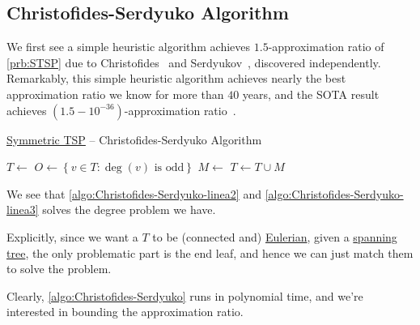 \subsection{Christofides-Serdyuko Algorithm}
We first see a simple heuristic algorithm achieves \(1.5\)-approximation ratio of \autoref{prb:STSP} due to Christofides~\cite{Christofides2022WorstCaseAO} and Serdyukov~\cite{Anatoliy}, discovered independently. Remarkably, this simple heuristic algorithm achieves nearly the best approximation ratio we know for more than \(40\) years, and the SOTA result achieves \((1.5-10^{-36})\)-approximation ratio~\cite{10.1145/3406325.3451009}.

\begin{algorithm}[H]\label{algo:Christofides-Serdyuko}
	\DontPrintSemicolon
	\caption{\hyperref[prb:STSP]{Symmetric TSP} -- Christofides-Serdyuko Algorithm~\cite{Christofides2022WorstCaseAO,Anatoliy}}
	\BlankLine
	\(T \gets\)\label{algo:Christofides-Serdyuko-linea1}
	\(O\gets \left\{ v\in T \colon \deg(v)\text{ is odd}\right\} \)\label{algo:Christofides-Serdyuko-linea2}\;
	\(M\gets\)\label{algo:Christofides-Serdyuko-linea3}
	\(T\gets T \cup M\)\;
	\;
\end{algorithm}

\begin{remark}
	We see that \autoref{algo:Christofides-Serdyuko-linea2} and \autoref{algo:Christofides-Serdyuko-linea3} solves the degree problem we have.
\end{remark}
\begin{explanation}
	Explicitly, since we want a \(T\) to be (connected and) \href{https://en.wikipedia.org/wiki/Eulerian_path}{Eulerian}, given a \hyperref[def:spanning-tree]{spanning tree}, the only problematic part is the end leaf, and hence we can just match them to solve the problem.
\end{explanation}

Clearly, \autoref{algo:Christofides-Serdyuko} runs in polynomial time, and we're interested in bounding the approximation ratio.

